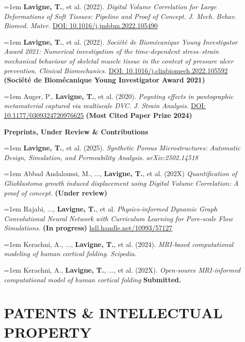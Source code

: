 \documentclass[10pt, a4paper]{article}
\newcommand{\pubentry}[1]{%
  \noindent\hangindent=1em\hangafter=1 #1\par\vspace{3pt}
}
\begin{document}
\pubentry{\textbf{Lavigne, T.}, et al. (2022). \textit{Digital Volume Correlation for Large Deformations of Soft Tissues: Pipeline and Proof of Concept.} \textit{J. Mech. Behav. Biomed. Mater.} \href{https://doi.org/10.1016/j.jmbbm.2022.105490}{DOI: 10.1016/j.jmbbm.2022.105490}}

\pubentry{\textbf{Lavigne, T.}, et al. (2022). \textit{Société de Biomécanique Young Investigator Award 2021: Numerical investigation of the time-dependent stress–strain mechanical behaviour of skeletal muscle tissue in the context of pressure ulcer prevention.} \textit{Clinical Biomechanics.} \href{https://doi.org/10.1016/j.clinbiomech.2022.105592}{DOI: 10.1016/j.clinbiomech.2022.105592} \textbf{(Société de Biomécanique Young Investigator Award 2021)}}

\pubentry{Auger, P., \textbf{Lavigne, T.}, et al. (2020). \textit{Poynting effects in pantographic metamaterial captured via multiscale DVC.} \textit{J. Strain Analysis.} \href{https://doi.org/10.1177/0309324720976625}{DOI: 10.1177/0309324720976625} \textbf{(Most Cited Paper Prize 2024)}}

\textbf{Preprints, Under Review \& Contributions}

\pubentry{\textbf{Lavigne, T.}, et al. (2025). \textit{Synthetic Porous Microstructures: Automatic Design, Simulation, and Permeability Analysis.} \textit{arXiv:2502.14518}}

\pubentry{Abbad Andaloussi, M., ..., \textbf{Lavigne, T.}, et al. (202X) \textit{Quantification of Glioblastoma growth induced displacement using Digital Volume Correlation: A proof of concept.} \textbf{(Under review)}}

\pubentry{Rajabi, ..., \textbf{Lavigne, T.}, et al. \textit{Physics-informed Dynamic Graph Convolutional Neural Network with Curriculum Learning for Pore-scale Flow Simulations.} \textbf{(In progress)} \href{https://hdl.handle.net/10993/57127}{hdl.handle.net/10993/57127}}

\pubentry{Kerachni, A., ..., \textbf{Lavigne, T.}, et al. (2024). \textit{MRI-based computational modeling of human cortical folding.} \textit{Scipedia.}}

\pubentry{Kerachni, A., \textbf{Lavigne, T.}, ..., et al. (202X). \textit{Open-source MRI-informed computational model
of human cortical folding} \textbf{Submitted.}}

\section{PATENTS \& INTELLECTUAL PROPERTY}
\end{document}
